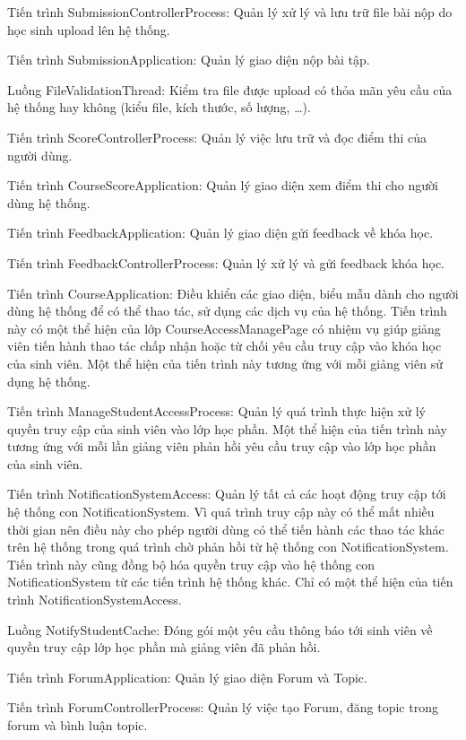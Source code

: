 \documentclass[./../main_file.tex]{subfiles}
\begin{document}
\begin{description}
\item Tiến trình SubmissionControllerProcess: Quản lý xử lý và lưu trữ file bài nộp do học sinh upload lên hệ thống.
\item Tiến trình SubmissionApplication: Quản lý giao diện nộp bài tập.
\item Luồng FileValidationThread: Kiểm tra file được upload có thỏa mãn yêu cầu của hệ thống hay không (kiểu file, kích thước, số lượng, …).
\item Tiến trình ScoreControllerProcess: Quản lý việc lưu trữ và đọc điểm thi của người dùng.
\item Tiến trình CourseScoreApplication: Quản lý giao diện xem điểm thi cho người dùng hệ thống.
\item Tiến trình FeedbackApplication: Quản lý giao diện gửi feedback về khóa học.
\item Tiến trình FeedbackControllerProcess: Quản lý xử lý và gửi feedback khóa học.
\item Tiến trình CourseApplication: Điều khiển các giao diện, biểu mẫu dành cho người dùng hệ thống để có thể thao tác, sử dụng các dịch vụ của hệ thống. Tiến trình này có một thể hiện của lớp CourseAccessManagePage có nhiệm vụ giúp giảng viên tiến hành thao tác chấp nhận hoặc từ chối yêu cầu truy cập vào khóa học của sinh viên.
Một thể hiện của tiến trình này tương ứng với mỗi giảng viên sử dụng hệ thống.
\item Tiến trình ManageStudentAccessProcess: Quản lý quá trình thực hiện xử lý quyền truy cập của sinh viên vào lớp học phần.
Một thể hiện của tiến trình này tương ứng với mỗi lần giảng viên phản hồi yêu cầu truy cập vào lớp học phần của sinh viên.
\item Tiến trình NotificationSystemAccess: Quản lý tất cả các hoạt động truy cập tới hệ thống con NotificationSystem. Vì quá trình truy cập này có thể mất nhiều thời gian nên điều này cho phép người dùng có thể tiến hành các thao tác khác trên hệ thống trong quá trình chờ phản hồi từ hệ thống con NotificationSystem. Tiến trình này cũng đồng bộ hóa quyền truy cập vào hệ thống con NotificationSystem từ các tiến trình hệ thống khác.
Chỉ có một thể hiện của tiến trình NotificationSystemAccess.
\item Luồng NotifyStudentCache: Đóng gói một yêu cầu thông báo tới sinh viên về quyền truy cập lớp học phần mà giảng viên đã phản hồi.
\item Tiến trình ForumApplication: Quản lý giao diện Forum và Topic.
\item Tiến trình ForumControllerProcess: Quản lý việc tạo Forum, đăng topic trong forum và bình luận topic.

\end{description}
\end{document}
